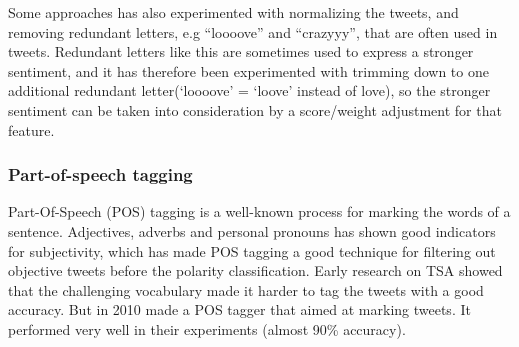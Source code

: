 Some approaches has also experimented with normalizing the tweets, and removing redundant letters, e.g “loooove” and “crazyyy”, that are often used in tweets. Redundant letters like this are sometimes used to express a stronger sentiment, and it has therefore been experimented with trimming down to one additional redundant letter(‘loooove’ = ‘loove’ instead of love), so the stronger sentiment can be taken into consideration by a score/weight adjustment for that feature.

\subsubsection*{Part-of-speech tagging}
Part-Of-Speech (POS) tagging is a well-known process for marking the words of a sentence. Adjectives, adverbs and personal pronouns has shown good indicators for subjectivity, which has made POS tagging a good technique for filtering out objective tweets before the polarity classification. Early research on TSA showed that the challenging vocabulary made it harder to tag the tweets with a good accuracy. But in 2010 \cite{article:gimpel} made a POS tagger that aimed at marking tweets. It performed very well in their experiments (almost 90\% accuracy).
